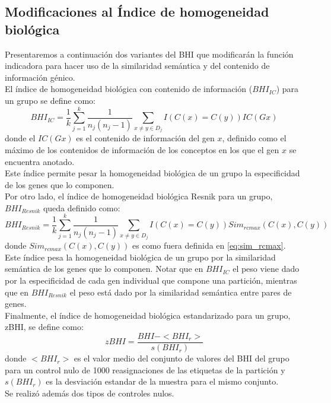 \subsection{Modificaciones al Índice de homogeneidad biológica}
Presentaremos a continuación dos variantes del BHI que modificarán la función indicadora para hacer uso de la similaridad semántica y del contenido de información génico.\\
El índice de homogeneidad biológica con contenido de información ($BHI_{IC}$) para un grupo se define como:
\begin{equation}
	BHI_{IC} = \frac{1}{k}\sum\limits_{j=1}^k\frac{1}{n_j(n_j-1)}\sum\limits_{x\neq y\in D_j}I(C(x)=C(y))IC(Gx)
\end{equation}
donde el $IC(Gx)$ es el contenido de información del gen $x$, definido como el máximo de los contenidos de información de los conceptos en los que el gen $x$ se encuentra anotado.\\
Este índice permite pesar la homogeneidad biológica de un grupo la especificidad de los genes que lo componen.\\
Por otro lado, el índice de homogeneidad biológica Resnik para un grupo, $BHI_{Resnik}$ queda definido como:
\begin{equation}
	BHI_{Resnik} = \frac{1}{k}\sum\limits_{j=1}^k\frac{1}{n_j(n_j-1)}\sum\limits_{x\neq y\in D_j}I(C(x)=C(y))Sim_{rcmax}(C(x), C(y))
\end{equation}
donde $Sim_{rcmax}(C(x), C(y))$ es como fuera definida en \ref{eq:sim_rcmax}.\\
Este índice pesa la homogeneidad biológica de un grupo por la similaridad semántica de los genes que lo componen. Notar que en $BHI_{IC}$ el peso viene dado por la especificidad de cada gen individual que compone una partición, mientras que en $BHI_{Resnik}$ el peso está dado por la similaridad semántica entre pares de genes.\\
Finalmente, el índice de homogeneidad biológica estandarizado para un grupo, zBHI, se define como:
\begin{equation}
	zBHI = \frac{BHI-<BHI_r>}{s(BHI_r)}
\end{equation}
donde $<BHI_r>$ es el valor medio del conjunto de valores del BHI del grupo para un control nulo de 1000 reasignaciones de las etiquetas de la partición y $s(BHI_r)$ es la desviación estandar de la muestra para el mismo conjunto.\\
Se realizó además dos tipos de controles nulos.\\
